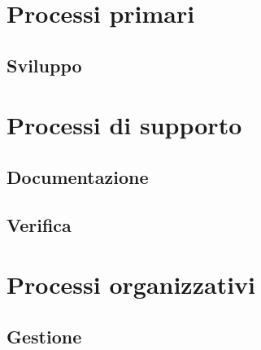 \documentclass[a4paper,titlepage]{article}
\begin{document}
\newpage
\tableofcontents
\listoffigures
\newpage


\section{Processi primari}
 \subsection{Sviluppo}

  
\section{Processi di supporto}
 \subsection{Documentazione}

 
 \subsection{Verifica}
  
\newpage
\section{Processi organizzativi}
 \subsection{Gestione}
  
\end{document}
